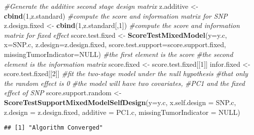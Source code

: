 \documentclass[11pt,]{article}
\newenvironment{Shaded}{\begin{snugshade}}{\end{snugshade}}
\newcommand{\KeywordTok}[1]{\textcolor[rgb]{0.13,0.29,0.53}{\textbf{#1}}}
\newcommand{\DataTypeTok}[1]{\textcolor[rgb]{0.13,0.29,0.53}{#1}}
\newcommand{\DecValTok}[1]{\textcolor[rgb]{0.00,0.00,0.81}{#1}}
\newcommand{\StringTok}[1]{\textcolor[rgb]{0.31,0.60,0.02}{#1}}
\newcommand{\CommentTok}[1]{\textcolor[rgb]{0.56,0.35,0.01}{\textit{#1}}}
\newcommand{\OtherTok}[1]{\textcolor[rgb]{0.56,0.35,0.01}{#1}}
\newcommand{\NormalTok}[1]{#1}
\begin{document}
\begin{Shaded}
\begin{Highlighting}[]
\CommentTok{#Generate the additive second stage design matrix}
\NormalTok{z.additive <-}\StringTok{ }\KeywordTok{cbind}\NormalTok{(}\DecValTok{1}\NormalTok{,z.standard)}
\CommentTok{#compute the score and information matrix for SNP}
\NormalTok{z.design.fixed <-}\StringTok{ }\KeywordTok{cbind}\NormalTok{(}\DecValTok{1}\NormalTok{,z.standard[,}\DecValTok{1}\NormalTok{])}
\CommentTok{#compute the score and information matrix for fixed effect}
\NormalTok{score.test.fixed <-}\StringTok{ }\KeywordTok{ScoreTestMixedModel}\NormalTok{(}\DataTypeTok{y=}\NormalTok{y.c,}
                    \DataTypeTok{x=}\NormalTok{SNP.c,}
                    \DataTypeTok{z.design=}\NormalTok{z.design.fixed,}
                    \DataTypeTok{score.test.support=}\NormalTok{score.support.fixed,}
                    \DataTypeTok{missingTumorIndicator=}\OtherTok{NULL}\NormalTok{)}
\CommentTok{#the first element is the score}
\CommentTok{#the second element is the information matrix}
\NormalTok{score.fixed <-}\StringTok{ }\NormalTok{score.test.fixed[[}\DecValTok{1}\NormalTok{]]}
\NormalTok{infor.fixed <-}\StringTok{ }\NormalTok{score.test.fixed[[}\DecValTok{2}\NormalTok{]]}
\CommentTok{#fit the two-stage model under the null hypothesis}
\CommentTok{#that only the random effect is 0}
\CommentTok{#the model will have two covariates, }
\CommentTok{#PC1 and the fixed effect of SNP}
\NormalTok{score.support.random <-}\StringTok{ }\KeywordTok{ScoreTestSupportMixedModelSelfDesign}\NormalTok{(}\DataTypeTok{y=}\NormalTok{y.c,}
                        \DataTypeTok{x.self.design  =}\NormalTok{ SNP.c,}
                        \DataTypeTok{z.design =}\NormalTok{ z.design.fixed,}
                        \DataTypeTok{additive =}\NormalTok{ PC1.c,}
                        \DataTypeTok{missingTumorIndicator =} \OtherTok{NULL}\NormalTok{)}
\end{Highlighting}
\end{Shaded}

\begin{verbatim}
## [1] "Algorithm Converged"
\end{verbatim}
\end{document}
